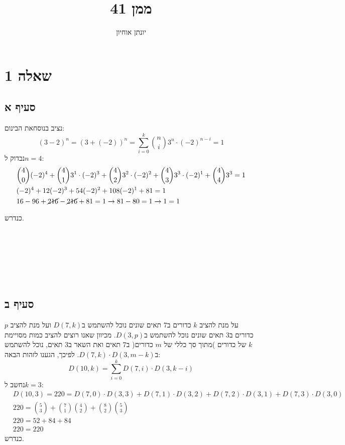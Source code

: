 \documentclass[11pt, oneside]{article}
\title{ממן 41}
\author{יונתן אוחיון}
\newcommand{\qed}{\R{$\blacksquare$}}
\newcommand{\br}{\\\\\\\\\\\\\\}
\newcommand{\opr}[1]{\xrightarrow[\text{#1}]{}}
\begin{document}
\maketitle

\section{שאלה 1}
\subsection{סעיף א}
נציב בנוסחאת הבינום:
\[
(3 - 2)^n = (3 + (-2))^n = \sum^k_{i = 0}{n \choose i}3^n \cdot (-2)^{n - i} = 1
\]
נבדוק ל$n = 4$:
\begin{eqnarray*}
& {4 \choose 0}(-2)^4 + {4 \choose 1}3^1 \cdot (-2)^3 + {4 \choose 2}3^2 \cdot (-2)^2 + {4 \choose 3}3^3  \cdot (-2)^1 + {4 \choose 4}3^3 = 1\\
& (-2)^4 + 12(-2)^3 + 54(-2)^2 + 108(-2)^1 + 81 = 1\\
& 16 - 96 + \cancel{216} - \cancel{216} + 81 = 1 \opr{} 81 - 80 = 1 \opr{} 1 = 1\\
\end{eqnarray*}
כנדרש.
\br\qed

\subsection{סעיף ב}
על מנת להציב $k$ כדורים ב$7$ תאים שונים נוכל להשתמש ב$D(7, k)$ ועל מנת להציב $p$ כדורים ב$3$ תאים שונים נוכל להשתמש ב$D(3, p)$. מכיוון שאנו רוצים להציב כמות מסויימת $k$ של כדורים )מתוך סך כללי של $m$ כדורים( ב$7$ תאים ואת השאר ב$3$ תאים, נוכל להשתמש ב$D(7, k) \cdot D(3, m - k)$. לפיכך, הגענו לזהות הבאה:
\[
D(10, k) = \sum^k_{i = 0}D(7, i) \cdot D(3, k - i)
\]
נחשב ל$k = 3$:
\begin{eqnarray*}
& D(10, 3) = 220 = D(7, 0) \cdot D(3, 3) + D(7, 1) \cdot D(3, 2) + D(7, 2) \cdot D(3, 1) + D(7, 3) \cdot D(3, 0)\\
& 220 = {5 \choose 3} + {7 \choose 1}{4 \choose 2} + {8 \choose 2}{5 \choose 3}\\
& 220 = 52 + 84 + 84\\
& 220 = 220
\end{eqnarray*}
כנדרש.
\br\qed
\clearpage

\end{document}
